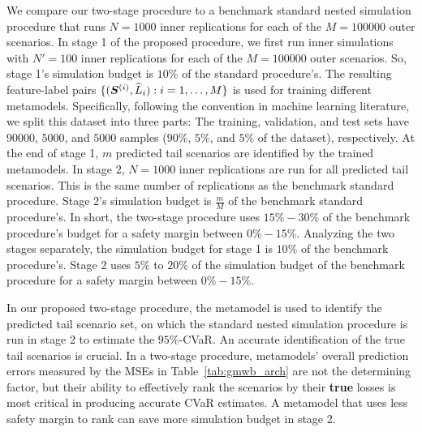 We compare our two-stage procedure to a benchmark standard nested simulation procedure that runs $N=\num{1000}$ inner replications for each of the $M=\num{100000}$ outer scenarios.
In stage 1 of the proposed procedure, we first run inner simulations with $N'=100$ inner replications for each of the $M=\num{100000}$ outer scenarios.
So, stage 1's simulation budget is $10\%$ of the standard procedure's.
The resulting feature-label pairs $\{(\bm{S}^{(i)}, \widehat{L}_i): i=1,\ldots,M\}$ is used for training different  metamodels.
Specifically, following the convention in machine learning literature, we split this dataset into three parts: The training, validation, and test sets have $\num{90000}$, $\num{5000}$, and $\num{5000}$ samples ($90\%$, $5\%$, and $5\%$ of the dataset), respectively.
At the end of stage 1, $m$ predicted tail scenarios are identified by the trained metamodels.
In stage 2, $N=\num{1000}$ inner replications are run for all predicted tail scenarios.
This is the same number of replications as the benchmark standard procedure.
Stage 2's simulation budget is $\frac{m}{M}$ of the benchmark standard procedure's.
In short, the two-stage procedure uses $15\% - 30\%$ of the benchmark procedure's budget for a safety margin between $0\% - 15\%$.
Analyzing the two stages separately, the simulation budget for stage 1 is $10\%$ of the benchmark procedure's.
Stage 2 uses $5\%$ to $20\%$ of the simulation budget of the benchmark procedure for a safety margin between $0\% - 15\%$.

In our proposed two-stage procedure, the metamodel is used to identify the predicted tail scenario set, on which the standard nested simulation procedure is run in stage 2 to estimate the $95\%$-CVaR.
An accurate identification of the true tail scenarios is crucial.
In a two-stage procedure, metamodels' overall prediction errors measured by the MSEs in Table~\ref{tab:gmwb_arch} are not the determining factor, but their ability to effectively rank the scenarios by their \textbf{true} losses is most critical in producing accurate CVaR estimates. 
A metamodel that uses less safety margin to rank can save more simulation budget in stage 2.

